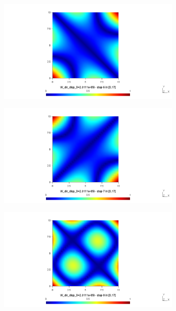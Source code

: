 \documentclass[9pt]{beamer}
\begin{document}
\begin{frame}
\begin{figure}[h!]
\begin{subfigure}{.3\textwidth}
\end{subfigure}\vfill
\begin{subfigure}{.3\textwidth}
\includegraphics[width=\linewidth,trim={8cm 4cm 8cm 2cm},clip]{VMP09_T12_pos_F7.png}
\end{subfigure} \hfill
\begin{subfigure}{.3\textwidth}
\includegraphics[width=\linewidth,trim={8cm 4cm 8cm 2cm},clip]{VMP09_T12_pos_F8.png}
\end{subfigure}\hfill
\begin{subfigure}{.3\textwidth}
\includegraphics[width=\linewidth,trim={8cm 4cm 8cm 2cm},clip]{VMP09_T12_pos_F9.png}
\end{subfigure}
\end{figure}


\end{frame}
\end{document}
